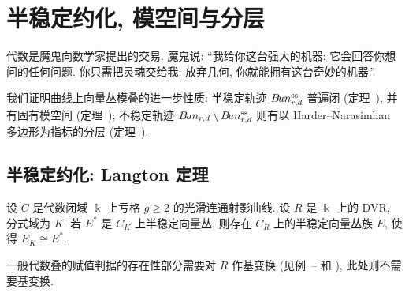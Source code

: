 \section{半稳定约化, 模空间与分层}\label{src:9.3}
\begin{epigraph}
代数是魔鬼向数学家提出的交易. 魔鬼说: ``我给你这台强大的机器; 它会回答你想问的任何问题. 你只需把灵魂交给我: 放弃几何, 你就能拥有这台奇妙的机器.''
\end{epigraph}
我们证明曲线上向量丛模叠的进一步性质: 半稳定轨迹 $B\!un_{r,d}^{\mathrm{ss}}$ 普遍闭 (定理~), 并有固有模空间 (定理~); 不稳定轨迹 $B\!un_{r,d}\setminus B\!un_{r,d}^{\mathrm{ss}}$ 则有以 Harder--Narasimhan 多边形为指标的分层 (定理~).
\subsection{半稳定约化: Langton 定理}\label{src:9.3.1-subsection}
\begin{theorem}[Langton 定理]\label{src:9.3.1}
设 $C$ 是代数闭域 $\Bbbk$ 上亏格 $g\geq2$ 的光滑连通射影曲线. 设 $R$ 是 $\Bbbk$ 上的 DVR, 分式域为 $K$. 若 $E^*$ 是 $C_K$ 上半稳定向量丛, 则存在 $C_R$ 上的半稳定向量丛族 $E$, 使得 $E_K\cong E^*$.
\end{theorem}
\begin{remark}\label{src:9.3.2}
一般代数叠的赋值判据的存在性部分需要对 $R$ 作基变换 (见例~-- 和 ), 此处则不需要基变换.
\end{remark}
